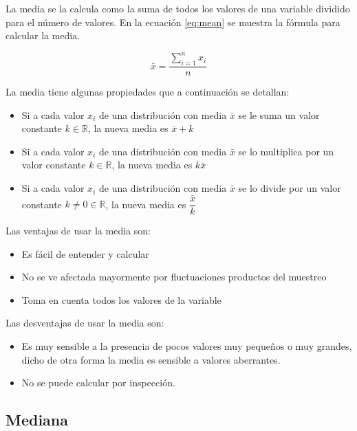 \documentclass[]{book}
\providecommand{\tightlist}{%
  \setlength{\itemsep}{0pt}\setlength{\parskip}{0pt}}
\begin{document}
La media se la calcula como la suma de todos los valores de una variable
dividido para el número de valores. En la ecuación \eqref{eq:mean} se
muestra la fórmula para calcular la media.

\begin{equation} 
  \bar{x} = \dfrac{\sum_{i=1}^{n}x_i}{n}
  \label{eq:mean}
\end{equation}

La media tiene algunas propiedades que a continuación se detallan:

\begin{itemize}
\tightlist
\item
  Si a cada valor \(x_i\) de una distribución con media \(\bar{x}\) se
  le suma un valor constante \(k \in \mathbb{R}\), la nueva media es
  \(\bar{x}+k\)
\item
  Si a cada valor \(x_i\) de una distribución con media \(\bar{x}\) se
  lo multiplica por un valor constante \(k \in \mathbb{R}\), la nueva
  media es \(k\bar{x}\)
\item
  Si a cada valor \(x_i\) de una distribución con media \(\bar{x}\) se
  lo divide por un valor constante \(k \neq 0 \in \mathbb{R}\), la nueva
  media es \(\dfrac{\bar{x}}{k}\)
\end{itemize}

Las ventajas de usar la media son:

\begin{itemize}
\tightlist
\item
  Es fácil de entender y calcular
\item
  No se ve afectada mayormente por fluctuaciones productos del muestreo
\item
  Toma en cuenta todos los valores de la variable
\end{itemize}

Las desventajas de usar la media son:

\begin{itemize}
\tightlist
\item
  Es muy sensible a la presencia de pocos valores muy pequeños o muy
  grandes, dicho de otra forma la media es sensible a valores
  aberrantes.
\item
  No se puede calcular por inspección.
\end{itemize}

\subsection{Mediana}\label{mediana}
\end{document}
